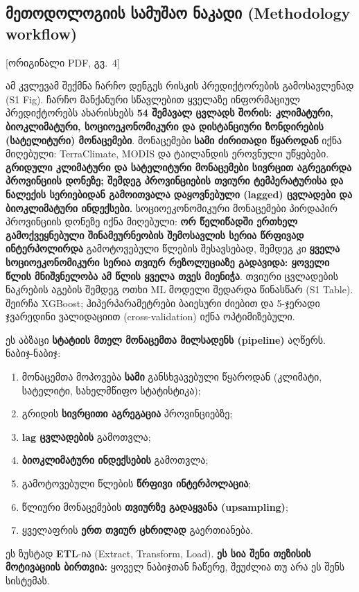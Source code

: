 \documentclass[11pt,a4paper]{article}
\newcommand{\imp}[1]{\textbf{\color{importred}#1}}
\newcommand{\pg}[1]{{\small\color{gray}[ორიგინალი PDF, გვ.~#1]}}
\begin{document}
\subsection*{მეთოდოლოგიის სამუშაო ნაკადი (Methodology workflow)} \pg{4}

ამ კვლევამ შექმნა ჩარჩო დენგეს რისკის პრედიქტორების გამოსავლენად (S1 Fig). ჩარჩო მანქანური სწავლებით
ყველაზე ინფორმაციულ პრედიქტორებს ახარისხებს \imp{54 შემავალ ცვლადს შორის: კლიმატური, ბიოკლიმატური,
სოციოეკონომიკური და დისტანციური ზონდირების (სატელიტური) მონაცემები}. მონაცემები \imp{სამი ძირითადი წყაროდან}
იქნა მიღებული: TerraClimate, MODIS და ტაილანდის ეროვნული უწყებები. \imp{გრიდული კლიმატური და სატელიტური
მონაცემები სივრცით აგრეგირდა პროვინციის დონეზე; შემდეგ პროვინციების თვიური ტემპერატურისა და ნალექის
სერიებიდან გამოითვალა დაყოვნებული (lagged) ცვლადები და ბიოკლიმატური ინდექსები.} სოციოეკონომიკური
მონაცემები პირდაპირ პროვინციის დონეზე იქნა მიღებული: \imp{ორ წელიწადში ერთხელ გამოქვეყნებული შინამეურნეობის
შემოსავლის სერია წრფივად ინტერპოლირდა} გამოტოვებული წლების შესავსებად, შემდეგ კი \imp{ყველა სოციოეკონომიკური
სერია თვიურ რეზოლუციაზე გადავიდა: ყოველი წლის მნიშვნელობა ამ წლის ყველა თვეს მიენიჭა}. თვიური ცვლადების
ნაკრების აგების შემდეგ ოთხი ML მოდელი შედარდა წინასწარ (S1 Table). შეირჩა XGBoost; ჰიპერპარამეტრები
ბაიესური ძიებით და 5-ჯერადი ჯვარედინი ვალიდაციით (cross-validation) იქნა ოპტიმიზებული.

\begin{etl}
ეს აბზაცი \textbf{სტატიის მთელ მონაცემთა მილსადენს (pipeline)} აღწერს. ნაბიჯ-ნაბიჯ:
\begin{enumerate}[leftmargin=1.5em]
  \item მონაცემთა მოპოვება \textbf{სამი} განსხვავებული წყაროდან (კლიმატი, სატელიტი, სახელმწიფო სტატისტიკა);
  \item გრიდის \textbf{სივრცითი აგრეგაცია} პროვინციებზე;
  \item \textbf{lag ცვლადების} გამოთვლა;
  \item \textbf{ბიოკლიმატური ინდექსების} გამოთვლა;
  \item გამოტოვებული წლების \textbf{წრფივი ინტერპოლაცია};
  \item წლიური მონაცემების \textbf{თვიურზე გადაყვანა (upsampling)};
  \item ყველაფრის \textbf{ერთ თვიურ ცხრილად} გაერთიანება.
\end{enumerate}
ეს ზუსტად \textbf{ETL}-ია (Extract, Transform, Load). \imp{ეს სია შენი თეზისის მოტივაციის ბირთვია:}
ყოველ ნაბიჯთან ჩაწერე, შეუძლია თუ არა ეს შენს სისტემას.
\end{etl}
\end{document}
